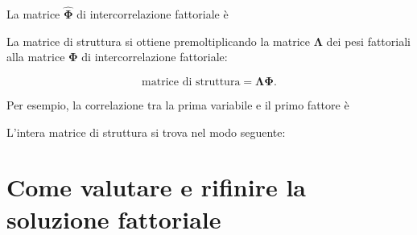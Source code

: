 \documentclass[
  11pt,
]{krantz}
\makeatletter
\newenvironment{Shaded}{\begin{snugshade}}{\end{snugshade}}
\newcommand{\CommentTok}[1]{\textcolor[rgb]{0.37,0.37,0.37}{\textit{#1}}}
\newcommand{\DecValTok}[1]{\textcolor[rgb]{0.06,0.06,0.06}{#1}}
\newcommand{\FunctionTok}[1]{\textcolor[rgb]{0,0,0}{#1}}
\newcommand{\NormalTok}[1]{#1}
\newcommand{\SpecialCharTok}[1]{\textcolor[rgb]{0,0,0}{#1}}
\newenvironment{kframe}{%
\medskip{}
\setlength{\fboxsep}{.8em}
 \def\at@end@of@kframe{}%
 \ifinner\ifhmode%
  \def\at@end@of@kframe{\end{minipage}}%
  \begin{minipage}{\columnwidth}%
 \fi\fi%
 \def\FrameCommand##1{\hskip\@totalleftmargin \hskip-\fboxsep
 \colorbox{shadecolor}{##1}\hskip-\fboxsep
     \hskip-\linewidth \hskip-\@totalleftmargin \hskip\columnwidth}%
 \MakeFramed {\advance\hsize-\width
   \@totalleftmargin\z@ \linewidth\hsize
   \@setminipage}}%
 {\par\unskip\endMakeFramed%
 \at@end@of@kframe}
\renewenvironment{Shaded}{\begin{kframe}}{\end{kframe}}
\theoremstyle{definition}
\theoremstyle{definition}
\theoremstyle{definition}
\theoremstyle{definition}
\theoremstyle{remark}
\makeatother
\begin{document}
La matrice \(\hat{\boldsymbol{\Phi}}\) di intercorrelazione fattoriale è

\begin{Shaded}
\end{Shaded}

La matrice di struttura si ottiene premoltiplicando la matrice \(\boldsymbol{\Lambda}\) dei pesi fattoriali alla matrice \(\boldsymbol{\Phi}\) di intercorrelazione fattoriale:

\[
\text{matrice di struttura} = \boldsymbol{\Lambda}\boldsymbol{\Phi}.
\]

Per esempio, la correlazione tra la prima variabile e il primo fattore è

\begin{Shaded}
\end{Shaded}

L'intera matrice di struttura si trova nel modo seguente:

\begin{Shaded}
\end{Shaded}

\hypertarget{ch:val_sol_fattoriale}{%
\chapter{Come valutare e rifinire la soluzione fattoriale}\label{ch:val_sol_fattoriale}}
\end{document}
